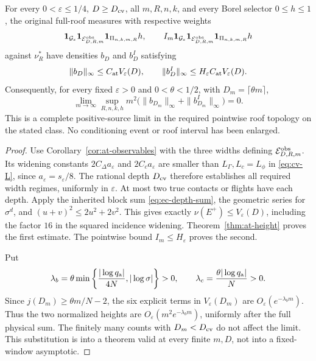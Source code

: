 \begin{theorem}
\label{thm:nh-bad-height}
For every $0<\varepsilon\le1/4$, $D\ge D_{\rm cv}$, all
$m,R,n,k$, and every Borel selector $0\le h\le1$, the original
full-roof measures with respective weights
\[
 \mathbf1_{\mathcal G_\varepsilon}
   \mathbf1_{\mathcal E^{\rm obs}_{D,R,m}}\mathbf1_{\Pi_{n,k,m,R}}h,
 \qquad
 I_m\mathbf1_{\mathcal G_\varepsilon}
   \mathbf1_{\mathcal E^{\rm obs}_{D,R,m}}\mathbf1_{\Pi_{n,k,m,R}}h
\]
against $\nu_R^*$ have densities $b_D$ and $b_D^I$ satisfying
\begin{equation}\label{eq:nh-height}
 \|b_D\|_\infty\le C_{\rm at}V_\varepsilon(D),\qquad
 \|b_D^I\|_\infty
                    \le H_\varepsilon C_{\rm at}V_\varepsilon(D).
\end{equation}
Consequently, for every fixed $\varepsilon>0$ and
$0<\theta<1/2$, with $D_m=\lceil\theta m\rceil$,
\begin{equation}\label{eq:nh-zero-height}
 \lim_{m\to\infty}\sup_{R,n,k,h}
       m^2\bigl(\|b_{D_m}\|_\infty+\|b^I_{D_m}\|_\infty\bigr)=0.
\end{equation}
This is a complete positive-source limit in the required
pointwise roof topology on the stated class.  No conditioning
event or roof interval has been enlarged.
\end{theorem}
\begin{proof}
Use Corollary~\ref{cor:at-observables} with the three widths
defining $\mathcal E^{\rm obs}_{D,R,m}$.  Its widening constants
$2C_\Delta a_\varepsilon$ and $2C_c a_\varepsilon$ are smaller
than $L_\Gamma,L_c=L_\phi$ in \eqref{eq:cv-L}, since
$a_\varepsilon=s_\varepsilon/8$.  The rational depth
$D_{\rm cv}$ therefore establishes all required width regimes,
uniformly in $\varepsilon$.  At most two true contacts or
flights have each depth.  Apply the inherited block sum
\eqref{eq:ec-depth-sum}, the geometric series for $\sigma^d$,
and $(u+v)^2\le2u^2+2v^2$.  This gives exactly
$\nu(E^+)\le V_\varepsilon(D)$, including the factor $16$ in
the squared incidence widening.  Theorem~\ref{thm:at-height}
proves the first estimate.  The pointwise bound
$I_m\le H_\varepsilon$ proves the second.

Put
\begin{equation}\label{eq:nh-rates}
 \lambda_b=\theta\min\left\{
                 \frac{|\log q_{\rm a}|}{4N},|\log\sigma|\right\}>0,
 \qquad \lambda_c=\frac{\theta|\log q_{\rm a}|}{N}>0.
\end{equation}
Since $j(D_m)\ge\theta m/N-2$, the six explicit terms in
$V_\varepsilon(D_m)$ are $O_\varepsilon(e^{-\lambda_bm})$.
Thus the two normalized heights are
$O_\varepsilon(m^2e^{-\lambda_bm})$, uniformly after the full
physical sum.  The finitely many counts with $D_m<D_{\rm cv}$
do not affect the limit.  This substitution is into a theorem
valid at every finite $m,D$, not into a fixed-window asymptotic.
\end{proof}

